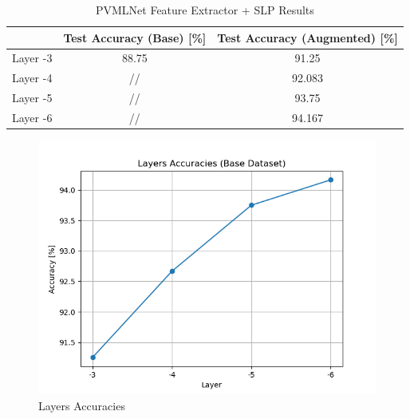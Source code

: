 \documentclass[10pt,a4paper]{report}
\begin{document}
\begin{table}[!ht]
\centering
\begin{tabular}{|c|c|c|}
\hline
         & Test Accuracy (Base) {[}\%{]} & Test Accuracy (Augmented) {[}\%{]} \\ \hline
Layer -3 & 88.75                         & 91.25                              \\ \hline
Layer -4 & //                            & 92.083                             \\ \hline
Layer -5 & //                            & 93.75                              \\ \hline
Layer -6 & //                            & 94.167                             \\ \hline
\end{tabular}
\caption{PVMLNet Feature Extractor + SLP Results}
\label{tab:ft-pvmlnet}
\end{table}

\begin{figure}[!ht]
\centering
\includegraphics[width=0.5\linewidth]{layers_acc.png}
\caption{Layers Accuracies}
\label{fig:lacc}
\end{figure} 
\end{document}
